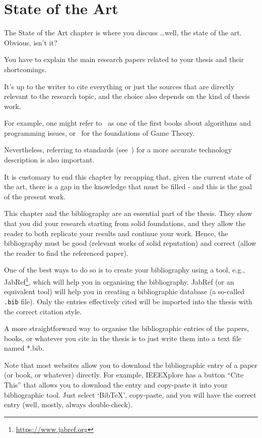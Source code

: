
\chapter{State of the Art}

The State of the Art chapter is where you discuss \ldots well, the state of the art. Obvious, isn't it?

You have to explain the main research papers related to your thesis and their shortcomings.

It's up to the writer to cite everything or just the sources that are directly relevant to the research topic, and the choice also depends on the kind of thesis work.

For example, one might refer to~\cite{knuth97} as one of the first books about algorithms and programming issues, or~\cite{nash51} for the foundations of Game Theory.

Nevertheless, referring to standards (see~\cite{rfc1925}) for a more accurate technology description is also important.

It is customary to end this chapter by recapping that, given the current state of the art, there is a gap in the knowledge that must be filled - and this is the goal of the present work.

This chapter and the bibliography are an essential part of the thesis. They show that you did your research starting from solid foundations, and they allow the reader to both replicate your results and continue your work.
Hence, the bibliography must be good (relevant works of solid reputation) and correct (allow the reader to find the referenced paper).

One of the best ways to do so is to create your bibliography using a tool, e.g., JabRef\footnote{\url{https://www.jabref.org}}, which will help you in organising the bibliography. JabRef (or an equivalent tool) will help you in creating a bibliographic database (a so-called \texttt{.bib} file). Only the entries effectively cited will be imported into the thesis with the correct citation style.

A more straightforward way to organise the bibliographic entries of the papers, books, or whatever you cite in the thesis is to just write them into a text file named *.bib.

Note that most websites allow you to download the bibliographic entry of a paper (or book, or whatever) directly. For example, IEEEXplore has a button ``Cite This'' that allows you to download the entry and copy-paste it into your bibliographic tool. Just select `BibTeX', copy-paste, and you will have the correct entry (well, mostly, always double-check).